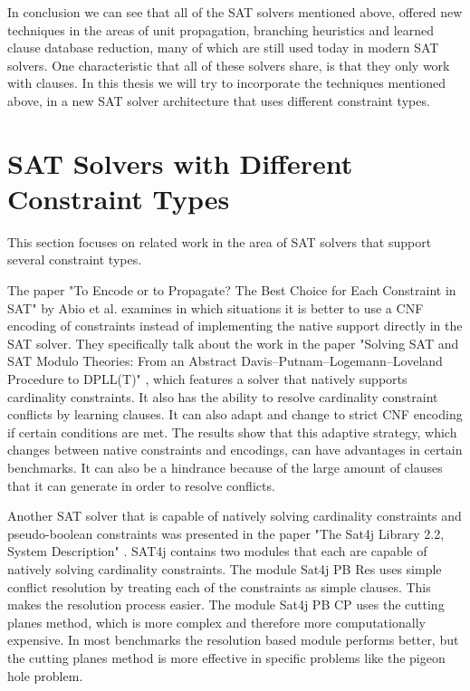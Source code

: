 In conclusion we can see that all of the SAT solvers mentioned above, offered new techniques in the areas of unit propagation, branching heuristics and learned clause database reduction, many of which are still used today in modern SAT solvers. One characteristic that all of these solvers share, is that they only work with clauses. In this thesis we will try to incorporate the techniques mentioned above, in a new SAT solver architecture that uses different constraint types.

\section{SAT Solvers with Different Constraint Types}
This section focuses on related work in the area of SAT solvers that support several constraint types.

The paper "To Encode or to Propagate? The Best Choice for Each Constraint in SAT" \cite{abio2013encode} by Abio et al. examines in which situations it is better to use a CNF encoding of constraints instead of implementing the native support directly in the SAT solver. They specifically talk about the work in the paper "Solving SAT and SAT Modulo Theories: From an Abstract
Davis–Putnam–Logemann–Loveland Procedure to DPLL(T)" \cite{nieuwenhuis2006solving}, which features a solver that natively supports cardinality constraints. It also has the ability to resolve cardinality constraint conflicts by learning clauses. It can also adapt and change to strict CNF encoding if certain conditions are met. The results show that this adaptive strategy, which changes between native constraints and encodings, can have advantages in certain benchmarks. It can also be a hindrance because of the large amount of clauses that it can generate in order to resolve conflicts.

Another SAT solver that is capable of natively solving cardinality constraints and pseudo-boolean constraints was presented in the paper "The Sat4j Library 2.2, System Description" \cite{le2010sat4j}. SAT4j contains two modules that each are capable of natively solving cardinality constraints. The module Sat4j PB Res uses simple conflict resolution by treating each of the constraints as simple clauses. This makes the resolution process easier. The module Sat4j PB CP uses the cutting planes method, which is more complex and therefore more computationally expensive. In most benchmarks the resolution based module performs better, but the cutting planes method is more effective in specific problems like the pigeon hole problem.

